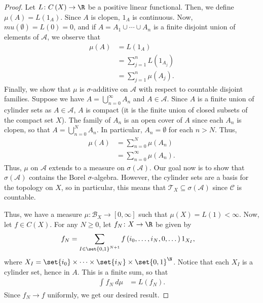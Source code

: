\documentclass[10pt]{mypackage}
\begin{document}
\begin{proof}
  Let $L\colon C\left( X \right)\to \R$ be a positive linear functional. Then, we define $\mu\left( A \right) = L\left( 1_A \right)$. Since $A$ is clopen, $1_A$ is continuous. Now, $mu\left( \emptyset \right) = L(0) = 0$, and if $A = A_1\cup\cdots\cup A_n$ is a finite disjoint union of elements of $\mathcal{A}$, we observe that
  \begin{align*}
    \mu\left( A \right) &= L\left( 1_A \right)\\
                        &= \sum_{j=1}^{n} L\left( 1_{A_j} \right)\\
                        &= \sum_{j=1}^{n}\mu\left( A_j \right).
  \end{align*}
  Finally, we show that $\mu$ is $\sigma$-additive on $\mathcal{A}$ with respect to countable disjoint families. Suppose we have $A = \bigcup_{n=0}^{\infty}A_n$ and $A\in \mathcal{A}$. Since $A$ is a finite union of cylinder sets as $A\in \mathcal{A}$, $A$ is compact (it is the finite union of closed subsets of the compact set $X$). The family of $A_n$ is an open cover of $A$ since each $A_n$ is clopen, so that $A = \bigcup_{n=0}^{N}A_n$. In particular, $A_n = \emptyset$ for each $n> N$. Thus, 
  \begin{align*}
    \mu\left( A \right) &= \sum_{n=0}^{N}\mu\left( A_n \right)\\
                        &= \sum_{n=0}^{\infty}\mu\left( A_n \right).
  \end{align*}
  Thus, $\mu$ on $\mathcal{A}$ extends to a measure on $\sigma\left( \mathcal{A} \right)$. Our goal now is to show that $\sigma\left( \mathcal{A} \right)$ contains the Borel $\sigma$-algebra. However, the cylinder sets are a basis for the topology on $X$, so in particular, this means that $ \mathcal{T}_X\subseteq \sigma\left( \mathcal{A} \right)$ since $\mathcal{C}$ is countable.

  Thus, we have a measure $\mu\colon \mathcal{B}_{X}\to [0,\infty]$ such that $\mu(X) = L(1) < \infty$. Now, let $f\in C(X)$. For any $N\geq 0$, let $f_N\colon X\to \R$ be given by
  \begin{align*}
    f_N &= \sum_{I\in \set{0,1}^{N+1}} f\left( i_0,\dots,i_N,0,\dots \right)1_{X_I},
  \end{align*}
  where $X_I = \set{i_0}\times\cdots\times\set{i_N}\times\set{0,1}^{\N}$. Notice that each $X_I$ is a cylinder set, hence in $A$. This is a finite sum, so that
  \begin{align*}
    \int_{}^{} f_N\:d\mu &= L\left( f_N \right).
  \end{align*}
  Since $f_N\to f$ uniformly, we get our desired result.
\end{proof}
\end{document}
